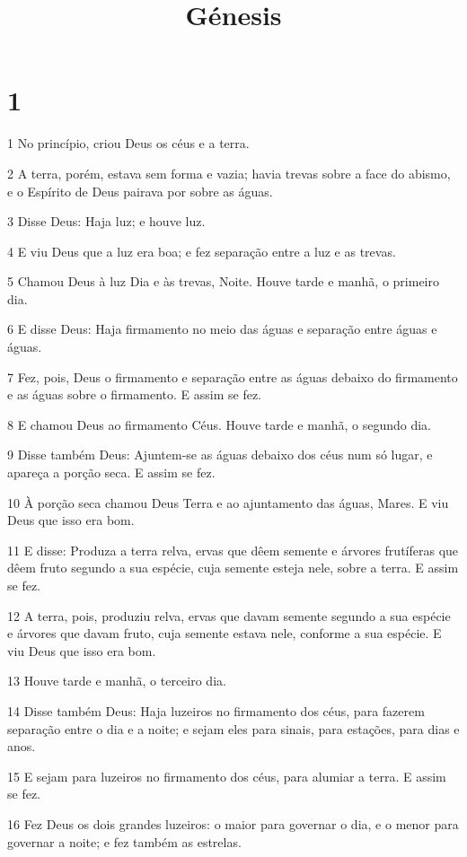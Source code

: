 

\title{Génesis}


\chapter{1}

\par 1 No princípio, criou Deus os céus e a terra.
\par 2 A terra, porém, estava sem forma e vazia; havia trevas sobre a face do abismo, e o Espírito de Deus pairava por sobre as águas.
\par 3 Disse Deus: Haja luz; e houve luz.
\par 4 E viu Deus que a luz era boa; e fez separação entre a luz e as trevas.
\par 5 Chamou Deus à luz Dia e às trevas, Noite. Houve tarde e manhã, o primeiro dia.
\par 6 E disse Deus: Haja firmamento no meio das águas e separação entre águas e águas.
\par 7 Fez, pois, Deus o firmamento e separação entre as águas debaixo do firmamento e as águas sobre o firmamento. E assim se fez.
\par 8 E chamou Deus ao firmamento Céus. Houve tarde e manhã, o segundo dia.
\par 9 Disse também Deus: Ajuntem-se as águas debaixo dos céus num só lugar, e apareça a porção seca. E assim se fez.
\par 10 À porção seca chamou Deus Terra e ao ajuntamento das águas, Mares. E viu Deus que isso era bom.
\par 11 E disse: Produza a terra relva, ervas que dêem semente e árvores frutíferas que dêem fruto segundo a sua espécie, cuja semente esteja nele, sobre a terra. E assim se fez.
\par 12 A terra, pois, produziu relva, ervas que davam semente segundo a sua espécie e árvores que davam fruto, cuja semente estava nele, conforme a sua espécie. E viu Deus que isso era bom.
\par 13 Houve tarde e manhã, o terceiro dia.
\par 14 Disse também Deus: Haja luzeiros no firmamento dos céus, para fazerem separação entre o dia e a noite; e sejam eles para sinais, para estações, para dias e anos.
\par 15 E sejam para luzeiros no firmamento dos céus, para alumiar a terra. E assim se fez.
\par 16 Fez Deus os dois grandes luzeiros: o maior para governar o dia, e o menor para governar a noite; e fez também as estrelas.

